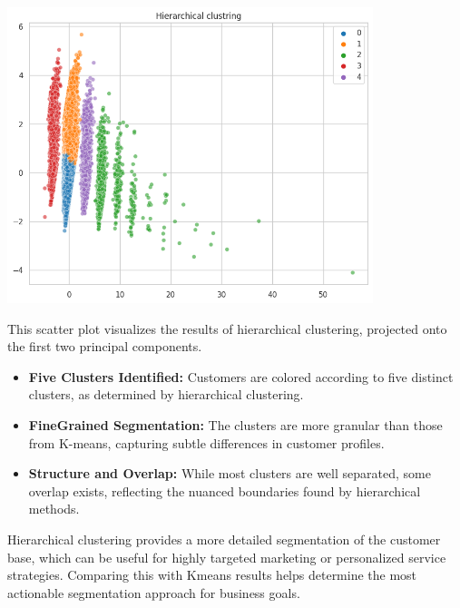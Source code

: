 \documentclass[a4paper]{article}
\begin{document}
\begin{multicols}{2}
\noindent
\begin{minipage}{\columnwidth}
\centering
\includegraphics[width=0.8\textwidth]{plots/Hierarchical clustring.png}
\label{fig:pca_hierarchical}
\end{minipage}

This scatter plot visualizes the results of hierarchical clustering, projected onto the first two principal components.

\begin{itemize}
    \item \textbf{Five Clusters Identified:} Customers are colored according to five distinct clusters, as determined by hierarchical clustering.
    \item \textbf{Fine\-Grained Segmentation:} The clusters are more granular than those from K-means, capturing subtle differences in customer profiles.
    \item \textbf{Structure and Overlap:} While most clusters are well separated, some overlap exists, reflecting the nuanced boundaries found by hierarchical methods.
\end{itemize}

Hierarchical clustering provides a more detailed segmentation of the customer base, which can be useful for highly targeted marketing or personalized service strategies. Comparing this with K\-means results helps determine the most actionable segmentation approach for business goals.




\end{multicols}
\end{document}
